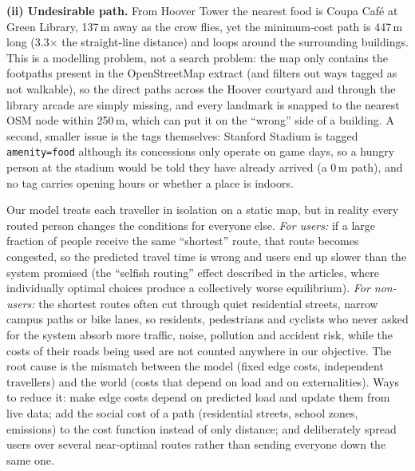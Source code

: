 \begin{solution}
\textbf{(ii) Undesirable path.} From Hoover Tower the nearest food is Coupa Caf\'e at Green Library, 137\,m away
as the crow flies, yet the minimum-cost path is 447\,m long (3.3$\times$ the straight-line distance) and loops
around the surrounding buildings. This is a modelling problem, not a search problem: the map only contains the
footpaths present in the OpenStreetMap extract (and filters out ways tagged as not walkable), so the direct
paths across the Hoover courtyard and through the library arcade are simply missing, and every landmark is
snapped to the nearest OSM node within 250\,m, which can put it on the ``wrong'' side of a building. A
second, smaller issue is the tags themselves: Stanford Stadium is tagged \texttt{amenity=food} although its
concessions only operate on game days, so a hungry person at the stadium would be told they have already
arrived (a 0\,m path), and no tag carries opening hours or whether a place is indoors.
\end{solution}

\begin{solution}
Our model treats each traveller in isolation on a static map, but in reality every routed person changes the
conditions for everyone else. \emph{For users:} if a large fraction of people receive the same ``shortest''
route, that route becomes congested, so the predicted travel time is wrong and users end up slower than the
system promised (the ``selfish routing'' effect described in the articles, where individually optimal
choices produce a collectively worse equilibrium). \emph{For non-users:} the shortest routes often cut through
quiet residential streets, narrow campus paths or bike lanes, so residents, pedestrians and cyclists who never
asked for the system absorb more traffic, noise, pollution and accident risk, while the costs of their roads
being used are not counted anywhere in our objective. The root cause is the mismatch between the model
(fixed edge costs, independent travellers) and the world (costs that depend on load and on externalities).
Ways to reduce it: make edge costs depend on predicted load and update them from live data; add the social
cost of a path (residential streets, school zones, emissions) to the cost function instead of only distance;
and deliberately spread users over several near-optimal routes rather than sending everyone down the same
one.
\end{solution}

